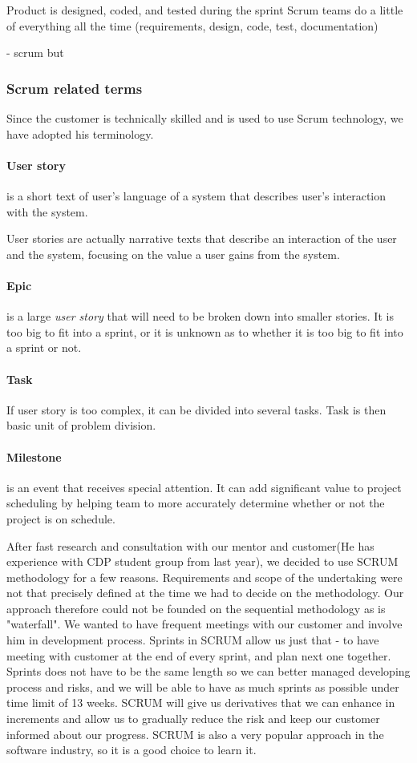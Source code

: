 Product is designed, coded, and tested during the sprint
Scrum teams do a little of everything all the time (requirements, design, code, test, documentation)

- scrum but

\subsubsection{Scrum related terms}

Since the customer is technically skilled and is used to use Scrum technology, we have adopted his terminology.
\paragraph{User story}
is a short text of user's language of a system that describes user's interaction with the system.

User stories are actually narrative texts that describe an interaction of the user and the system, focusing on the value a user gains from the system.

\paragraph{Epic}
is a large \emph{user story} that will need to be broken down into smaller stories. It is too big to fit into a sprint, or it is unknown as to whether it is too big to fit into a sprint or not.

\paragraph{Task}
If user story is too complex, it can be divided into several tasks. 
Task is then basic unit of problem division.


\paragraph{Milestone}
 is an event that receives special attention. It can add significant value to project scheduling by helping team to more accurately determine whether or not the project is on schedule.


After fast research and consultation with our mentor and customer(He has experience with CDP student group from last year), we decided to use SCRUM methodology for a few reasons. Requirements and scope of the undertaking were not that precisely defined at the time we had to decide on the methodology. Our approach therefore could not be founded on the sequential methodology as is "waterfall". We wanted to have frequent meetings with our customer and involve him in development process. Sprints in SCRUM allow us just that - 
to have meeting with customer at the end of every sprint, and plan next one together. Sprints does not have to be the same length so we can better managed developing process and risks, and we will be able to have as much sprints as possible under time limit of 13 weeks. SCRUM will give us derivatives that we can enhance in increments and allow us to gradually reduce the risk and keep our customer informed about our progress. SCRUM is also a very popular approach in the software industry, so it is a good choice to learn it.


